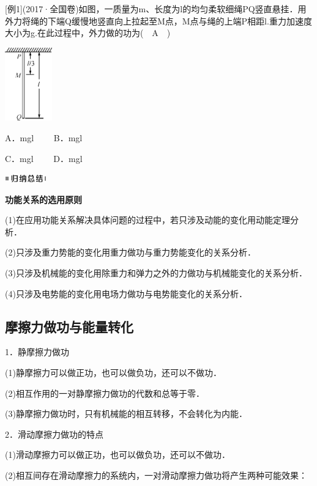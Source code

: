 {[}例1{]}(2017·全国卷\uppercase\expandafter{})如图，一质量为m、长度为l的均匀柔软细绳PQ竖直悬挂．用外力将绳的下端Q缓慢地竖直向上拉起至M点，M点与绳的上端P相距l.重力加速度大小为g.在此过程中，外力做的功为(　A　)

\begin{center}\includegraphics[width=0.80208in,height=1.24514in]{media/image240.png}\end{center}

A．mgl　　 B．mgl

C．mgl　　 D．mgl

\begin{center}\includegraphics[width=0.70764in,height=0.12292in]{media/image13.png}

\textbf{功能关系的选用原则}
\end{center}


(1)在应用功能关系解决具体问题的过程中，若只涉及动能的变化用动能定理分析．

(2)只涉及重力势能的变化用重力做功与重力势能变化的关系分析．

(3)只涉及机械能的变化用除重力和弹力之外的力做功与机械能变化的关系分析．

(4)只涉及电势能的变化用电场力做功与电势能变化的关系分析．


\subsection{摩擦力做功与能量转化}

1．静摩擦力做功

(1)静摩擦力可以做正功，也可以做负功，还可以不做功．

(2)相互作用的一对静摩擦力做功的代数和总等于零．

(3)静摩擦力做功时，只有机械能的相互转移，不会转化为内能．

2．滑动摩擦力做功的特点

(1)滑动摩擦力可以做正功，也可以做负功，还可以不做功．

(2)相互间存在滑动摩擦力的系统内，一对滑动摩擦力做功将产生两种可能效果：

